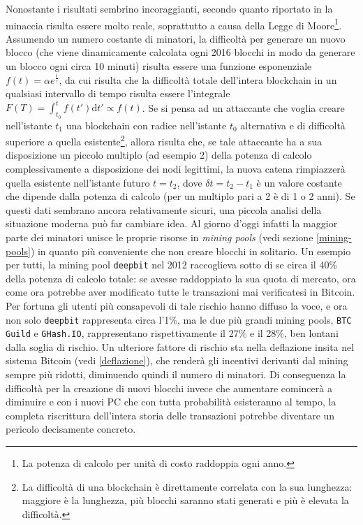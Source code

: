 Nonostante i risultati sembrino incoraggianti, secondo quanto riportato in \cite{bitter-better} la minaccia risulta essere molto reale, soprattutto a causa della Legge di Moore\footnote{La potenza di calcolo per unità di costo raddoppia ogni anno.}.
Assumendo un numero costante di minatori, la difficoltà per generare un nuovo blocco (che viene dinamicamente calcolata ogni 2016 blocchi in modo da generare un blocco ogni circa 10 minuti) risulta essere una funzione esponenziale $f(t) = \alpha e^\frac{t}{\tau}$, da cui risulta che la difficoltà totale dell'intera blockchain in un qualsiasi intervallo di tempo risulta essere l'integrale $F(T) = \int^t_{t_0} f(t')\mathrm{d} t' \propto f(t)$.
Se si pensa ad un attaccante che voglia creare nell'istante $t_1$ una blockchain con radice nell'istante $t_0$ alternativa e di difficoltà superiore a quella esistente\footnote{La difficoltà di una blockchain è direttamente correlata con la sua lunghezza: maggiore è la lunghezza, più blocchi saranno stati generati e più è elevata la difficoltà.}, allora risulta che, se tale attaccante ha a sua disposizione un piccolo multiplo (ad esempio 2) della potenza di calcolo complessivamente a disposizione dei nodi legittimi, la nuova catena rimpiazzerà quella esistente nell'istante futuro $t=t_2$, dove $\delta t = t_2 - t_1$ è un valore costante che dipende dalla potenza di calcolo (per un multiplo pari a 2 è di 1 o 2 anni).
Se questi dati sembrano ancora relativamente sicuri, una piccola analisi della situazione moderna può far cambiare idea. Al giorno d'oggi infatti la maggior parte dei minatori unisce le proprie risorse in \emph{mining pools} (vedi sezione \ref{mining-pools}) in quanto più conveniente che non creare blocchi in solitario. Un esempio per tutti, la mining pool \verb|deepbit| nel 2012 raccoglieva sotto di se circa il 40\% della potenza di calcolo totale: se avesse raddoppiato la sua quota di mercato, ora come ora potrebbe aver modificato tutte le transazioni mai verificatesi in Bitcoin. Per fortuna gli utenti più consapevoli di tale rischio hanno diffuso la voce, e ora non solo \verb|deepbit| rappresenta circa l'1\%, ma le due più grandi mining pools, \verb|BTC Guild| e \verb|GHash.IO|, rappresentano rispettivamente il 27\% e il 28\%, ben lontani dalla soglia di rischio.
Un ulteriore fattore di rischio sta nella deflazione insita nel sistema Bitcoin (vedi \ref{deflazione}), che renderà gli incentivi derivanti dal mining sempre più ridotti, diminuendo quindi il numero di minatori. Di conseguenza la difficoltà per la creazione di nuovi blocchi invece che aumentare comincerà a diminuire e con i nuovi PC che con tutta probabilità esisteranno al tempo, la completa riscrittura dell'intera storia delle transazioni potrebbe diventare un pericolo decisamente concreto.

